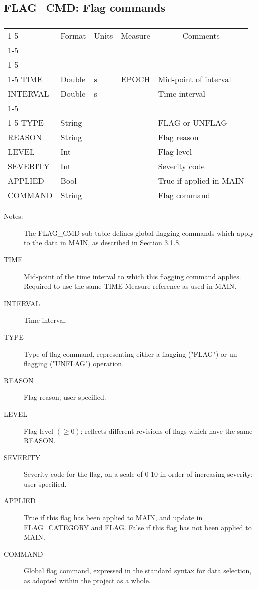 \documentclass{article}
\newcommand{\defline}[1]{\cline{1-5}
\multicolumn{5}{|l|}{#1} \\
\cline{1-5}}
\newcommand{\definetable}[3][]
{
  \vfill\newpage
  \subsection{#2}
  \label{tbl:#1}
  \vspace{0.15in}
  \small
  \begin{tabular}{|l|p{1.25in}|l|p{.9in}|p{1.4in}|}
  \hline
  \multicolumn{5}{|c|}{\bf #1}\\
  \cline{1-5}
  \multicolumn{1}{|c|}{Name}&\multicolumn{1}{|c|}{Format}&
  \multicolumn{1}{|c|}{Units}&\multicolumn{1}{|c|}{Measure}&
  \multicolumn{1}{|c|}{Comments}\\
  \cline{1-5}
  #3
  \hline
  \end{tabular}
}
\begin{document}
\definetable{FLAG\_CMD: Flag commands}{
\defline{\bf Columns}
\defline{\em Key}
TIME      &    Double   &   s  &  EPOCH & Mid-point of interval \\
INTERVAL  &    Double   &   s  &        & Time interval \\
\defline{\em Data}
TYPE      &    String   &      &        & FLAG or UNFLAG\\
REASON    &    String   &      &        & Flag reason\\
LEVEL     &    Int      &      &        & Flag level\\
SEVERITY  &    Int      &      &        & Severity code\\
APPLIED   &    Bool     &      &        & True if applied in MAIN\\
COMMAND   & String  &      &        & Flag command\\
}
\begin{description}

\item[Notes:] The FLAG\_CMD sub-table defines global flagging commands
which apply to the data in MAIN, as described in Section 3.1.8.

\item[TIME] Mid-point of the time interval to which this flagging
command applies. Required to use the same TIME Measure reference as
used in MAIN.

\item[INTERVAL] Time interval.

\item[TYPE] Type of flag command, representing either a flagging
("FLAG") or un-flagging ("UNFLAG") operation.

\item[REASON] Flag reason; user specified.

\item[LEVEL] Flag level $(\geq 0)$; reflects different revisions of
flags which have the same REASON.

\item[SEVERITY] Severity code for the flag, on a scale of 0-10 in
order of increasing severity; user specified.

\item[APPLIED] True if this flag has been applied to MAIN, and update
in FLAG\_CATEGORY and FLAG. False if this flag has not been applied to
MAIN.

\item[COMMAND] Global flag command, expressed in the standard
syntax for data selection, as adopted within the project as a whole.

\end{description}
\end{document}
